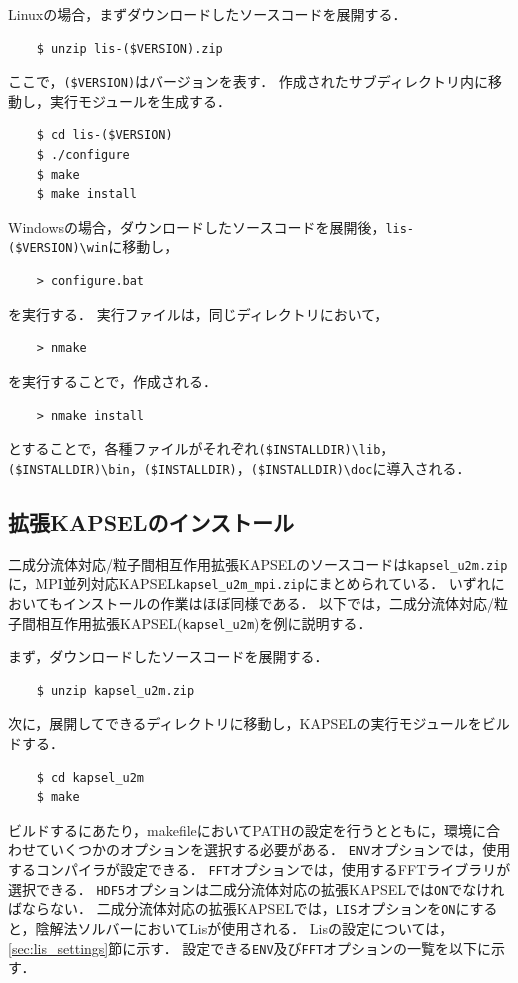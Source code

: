 \documentclass[pdflatex,a4paper,10pt,ja=standard]{bxjsarticle}
\begin{document}
Linuxの場合，まずダウンロードしたソースコードを展開する．
\begin{verbatim}
    $ unzip lis-($VERSION).zip
\end{verbatim}
ここで，\verb|($VERSION)|はバージョンを表す．
作成されたサブディレクトリ内に移動し，実行モジュールを生成する．
\begin{verbatim}
    $ cd lis-($VERSION)
    $ ./configure
    $ make
    $ make install
\end{verbatim}

Windowsの場合，ダウンロードしたソースコードを展開後，\verb|lis-($VERSION)\win|に移動し，
\begin{verbatim}
    > configure.bat
\end{verbatim}
を実行する．
実行ファイルは，同じディレクトリにおいて，
\begin{verbatim}
    > nmake
\end{verbatim}
を実行することで，作成される．
\begin{verbatim}
    > nmake install
\end{verbatim}
とすることで，各種ファイルがそれぞれ\verb|($INSTALLDIR)\lib|，\verb|($INSTALLDIR)\bin|，\verb|($INSTALLDIR)|，\verb|($INSTALLDIR)\doc|に導入される．

\subsection{拡張KAPSELのインストール}

二成分流体対応/粒子間相互作用拡張KAPSELのソースコードは\verb|kapsel_u2m.zip|に，MPI並列対応KAPSEL\verb|kapsel_u2m_mpi.zip|にまとめられている．
いずれにおいてもインストールの作業はほぼ同様である．
以下では，二成分流体対応/粒子間相互作用拡張KAPSEL(\verb|kapsel_u2m|)を例に説明する．

まず，ダウンロードしたソースコードを展開する．

\begin{verbatim}
    $ unzip kapsel_u2m.zip
\end{verbatim}

次に，展開してできるディレクトリに移動し，KAPSELの実行モジュールをビルドする．
\begin{verbatim}
    $ cd kapsel_u2m
    $ make
\end{verbatim}

ビルドするにあたり，makefileにおいてPATHの設定を行うとともに，環境に合わせていくつかのオプションを選択する必要がある．
\verb|ENV|オプションでは，使用するコンパイラが設定できる．
\verb|FFT|オプションでは，使用するFFTライブラリが選択できる．
\verb|HDF5|オプションは二成分流体対応の拡張KAPSELでは\verb|ON|でなければならない．
二成分流体対応の拡張KAPSELでは，\verb|LIS|オプションを\verb|ON|にすると，陰解法ソルバーにおいてLisが使用される．
Lisの設定については，\ref{sec:lis_settings}節に示す．
設定できる\verb|ENV|及び\verb|FFT|オプションの一覧を以下に示す．
\end{document}
